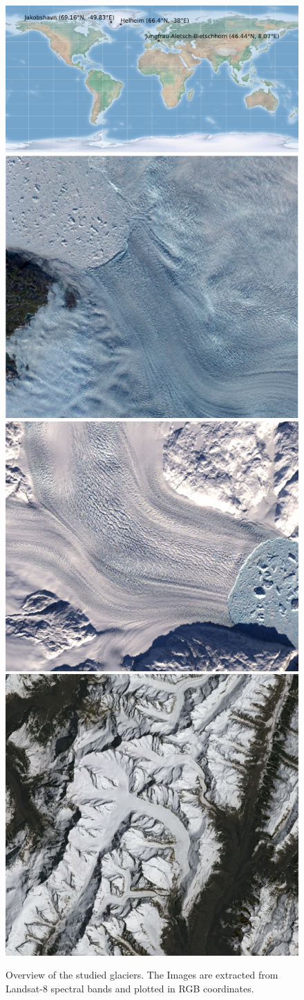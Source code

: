 \documentclass[12pt]{article}
\begin{document}
\begin{figure}[h]%
	
	\centering
	\includegraphics[scale = 0.581]{map.pdf}
	\newline
	\newline
	\includegraphics[width=.3\textwidth]{jakobshavn.pdf}\hfill
	\includegraphics[width=.3\textwidth]{helheim.pdf}\hfill
	\includegraphics[width=.3\textwidth]{aletsch.pdf}
	
	
	\caption{Overview of the studied glaciers. The Images are extracted from Landsat-8 spectral bands and plotted in RGB coordinates.}
	\label{fig:figure1}
	
\end{figure}
\end{document}
